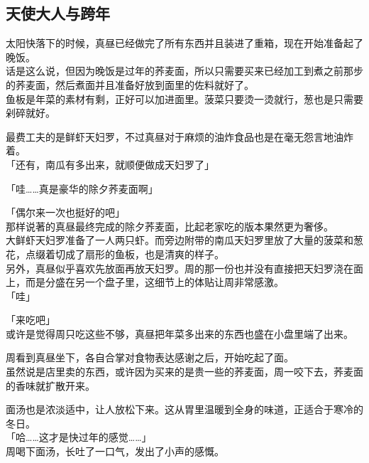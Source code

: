 \subsection{天使大人与跨年}

太阳快落下的时候，真昼已经做完了所有东西并且装进了重箱，现在开始准备起了晚饭。\\

话是这么说，但因为晚饭是过年的荞麦面，所以只需要买来已经加工到煮之前那步的荞麦面，然后煮面并且准备好放到面里的佐料就好了。\\

鱼板是年菜的素材有剩，正好可以加进面里。菠菜只要烫一烫就行，葱也是只需要剁碎就好。

最费工夫的是鲜虾天妇罗，不过真昼对于麻烦的油炸食品也是在毫无怨言地油炸着。\\

「还有，南瓜有多出来，就顺便做成天妇罗了」

「哇……真是豪华的除夕荞麦面啊」

「偶尔来一次也挺好的吧」\\

那样说著的真昼最终完成的除夕荞麦面，比起老家吃的版本果然更为奢侈。\\

大鲜虾天妇罗准备了一人两只虾。而旁边附带的南瓜天妇罗里放了大量的菠菜和葱花，点缀着切成了扇形的鱼板，也是清爽的样子。\\

另外，真昼似乎喜欢先放面再放天妇罗。周的那一份也并没有直接把天妇罗浇在面上，而是分盛在另一个盘子里，这细节上的体贴让周非常感激。\\

「哇」

「来吃吧」\\

或许是觉得周只吃这些不够，真昼把年菜多出来的东西也盛在小盘里端了出来。

周看到真昼坐下，各自合掌对食物表达感谢之后，开始吃起了面。\\

虽然说是店里卖的东西，或许因为买来的是贵一些的荞麦面，周一咬下去，荞麦面的香味就扩散开来。

面汤也是浓淡适中，让人放松下来。这从胃里温暖到全身的味道，正适合于寒冷的冬日。\\

「哈……这才是快过年的感觉……」\\

周喝下面汤，长吐了一口气，发出了小声的感慨。\\

